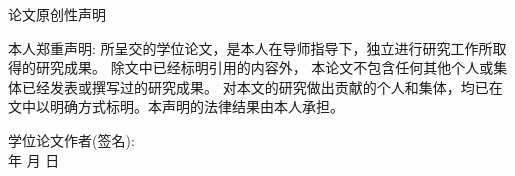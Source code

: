 {\pagestyle{empty}
\newpage
\vspace*{20pt}
\begin{center}{\heiti{} 论文原创性声明}\end{center}
\par\vspace*{30pt}
\renewcommand{\baselinestretch}{2}
{ \songti %


本人郑重声明: 所呈交的学位论文，是本人在导师指导下，独立进行研究工作所取得的研究成果。
除文中已经标明引用的内容外， 本论文不包含任何其他个人或集体已经发表或撰写过的研究成果。
对本文的研究做出贡献的个人和集体，均已在文中以明确方式标明。本声明的法律结果由本人承担。

\thispagestyle{empty}%
\vskip2cm

\hspace*{4cm}学位论文作者(签名): \hspace{4cm} \hfill \\[1cm]
\hspace*{10cm}年 \hfill  月 \hfill 日\hspace{1cm}\hfill\par}

  \iflib
  \else
  \newpage
  \cleardoublepage
  \fi
  \thispagestyle{empty}%
}
\renewcommand{\baselinestretch}{1.6}
\small\normalsize




